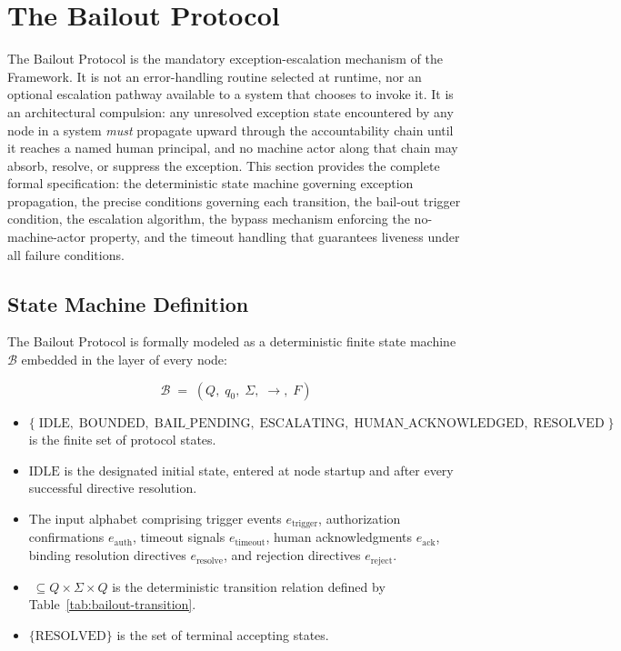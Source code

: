 \section{The Bailout Protocol}\label{sec:bailout}

The Bailout Protocol is the mandatory exception-escalation mechanism of the \bxthree{} Framework. It is not an error-handling routine selected at runtime, nor an optional escalation pathway available to a system that chooses to invoke it. It is an architectural compulsion: any unresolved exception state encountered by any node in a \bxthree{} system \emph{must} propagate upward through the accountability chain until it reaches a named human principal, and no machine actor along that chain may absorb, resolve, or suppress the exception. This section provides the complete formal specification: the deterministic state machine governing exception propagation, the precise conditions governing each transition, the bail-out trigger condition, the escalation algorithm, the bypass mechanism enforcing the no-machine-actor property, and the timeout handling that guarantees liveness under all failure conditions.

\subsection{State Machine Definition}\label{sec:state-machine}

The Bailout Protocol is formally modeled as a deterministic finite state machine $\mathcal{B}$ embedded in the \fact{} layer of every \bxthree{} node:

\[
\mathcal{B} \;=\; (Q,\; q_0,\; \Sigma,\; \rightarrow,\; F)
\]

\begin{itemize}\itemsep=0pt
\item[$Q$] $\{\; \text{IDLE},\; \text{BOUNDED},\; \text{BAIL\_PENDING},\; \text{ESCALATING},\; \text{HUMAN\_ACKNOWLEDGED},\; \text{RESOLVED}\; \}$ is the finite set of protocol states.
\item[$q_0$] $\text{IDLE}$ is the designated initial state, entered at node startup and after every successful directive resolution.
\item[$\Sigma$] The input alphabet comprising trigger events $e_{\text{trigger}}$, authorization confirmations $e_{\text{auth}}$, timeout signals $e_{\text{timeout}}$, human acknowledgments $e_{\text{ack}}$, binding resolution directives $e_{\text{resolve}}$, and rejection directives $e_{\text{reject}}$.
\item[$\rightarrow$] $\; \subseteq Q \times \Sigma \times Q$ is the deterministic transition relation defined by Table~\ref{tab:bailout-transition}.
\item[$F$] $\{\text{RESOLVED}\}$ is the set of terminal accepting states.
\end{itemize}

